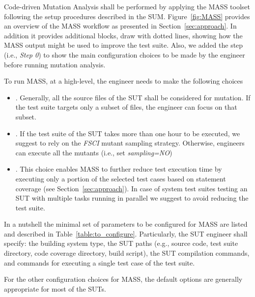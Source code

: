 Code-driven Mutation Analysis shall be performed by applying the MASS toolset following the setup procedures described in the SUM. Figure~\ref{fig:MASS} provides an overview of the MASS workflow as presented in Section~\ref{sec:approach}. In addition it provides additional blocks, draw with dotted lines, showing how the MASS output might be used to improve the test suite. Also, we added the step  (i.e., \emph{Step 0}) to show the main configuration choices to be made by the engineer before running mutation analysis.

To run MASS, at a high-level, the engineer needs to make the following choices
\begin{itemize}
\item {}. Generally, all the source files of the SUT shall be considered for mutation. If the test suite targets only a subset  of files, the engineer can focus on that subset.
\item {}. If the test suite of the SUT takes more than one hour to be executed, we suggest to rely on the \emph{FSCI} mutant sampling strategy. Otherwise, engineers can execute all the mutants (i.e., set \emph{sampling=NO})
\item {}. This choice enables MASS to further reduce test execution time by executing only a portion of the selected test cases based on statement coverage (see Section~\ref{sec:approach}). In case of system test suites testing an SUT with multiple tasks running in parallel we suggest to avoid reducing the test suite.
\end{itemize}

\STARTCHANGEDFINAL


In a nutshell the minimal set of parameters to be configured for MASS are listed and described in Table~\ref{table:to_configure}. Particularly, the SUT engineer shall specify: the building system type, the SUT paths (e.g., source code, test suite directory, code coverage directory, build script), the SUT compilation commands, and commands for executing a single test case of the test suite.
\ENDCHANGEDFINAL

For the other configuration choices for MASS, the default options are generally appropriate for most of the SUTs.

